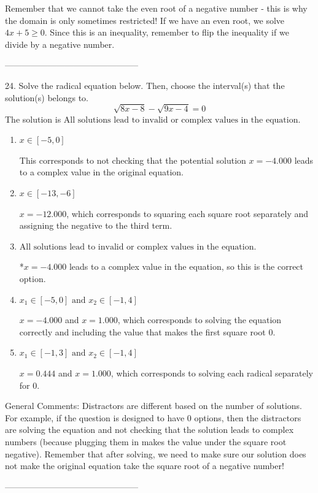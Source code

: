 \documentclass{extbook}[14pt]
\begin{document}
Remember that we cannot take the even root of a negative number - this is why the domain is only sometimes restricted! If we have an even root, we solve $4 x + 5 \geq 0$. Since this is an inequality, remember to flip the inequality if we divide by a negative number.

-----------------------------------------------

24. Solve the radical equation below. Then, choose the interval(s) that the solution(s) belongs to.
\[ \sqrt{8 x - 8} - \sqrt{9 x - 4} = 0 \] 
The solution is $ \text{All solutions lead to invalid or complex values in the equation.} $ 

\begin{enumerate}[label=\Alph*.] 
\item $ x \in [-5,0] $ 

 This corresponds to not checking that the potential solution $x = -4.000$ leads to a complex value in the original equation. 
\item $ x \in [-13,-6] $ 

 $x = -12.000$, which corresponds to squaring each square root separately and assigning the negative to the third term. 
\item $ \text{All solutions lead to invalid or complex values in the equation.} $ 

 *$x = -4.000$ leads to a complex value in the equation, so this is the correct option. 
\item $ x_1 \in [-5, 0] \text{ and } x_2 \in [-1,4] $ 

 $x = -4.000$ and $x = 1.000$, which corresponds to solving the equation correctly and including the value that makes the first square root 0. 
\item $ x_1 \in [-1, 3] \text{ and } x_2 \in [-1,4] $ 

 $x = 0.444$ and $x = 1.000$, which corresponds to solving each radical separately for 0. 
\end{enumerate} 
 
General Comments: Distractors are different based on the number of solutions. For example, if the question is designed to have 0 options, then the distractors are solving the equation and not checking that the solution leads to complex numbers (because plugging them in makes the value under the square root negative). Remember that after solving, we need to make sure our solution does not make the original equation take the square root of a negative number!

-----------------------------------------------
\end{document}
